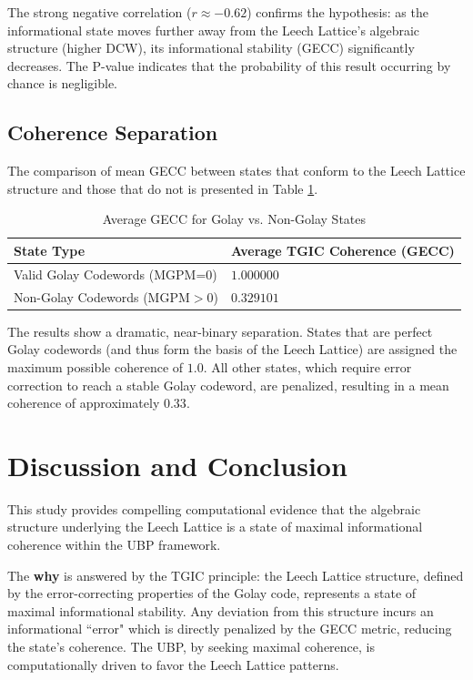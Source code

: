 \documentclass[10pt, a4paper]{article}
\begin{document}
The strong negative correlation ($r \approx -0.62$) confirms the hypothesis: as the informational state moves further away from the Leech Lattice's algebraic structure (higher DCW), its informational stability (GECC) significantly decreases. The P-value indicates that the probability of this result occurring by chance is negligible.

\subsection{Coherence Separation}

The comparison of mean GECC between states that conform to the Leech Lattice structure and those that do not is presented in Table \ref{tab:coherence_separation}.

\begin{table}[h]
    \centering
    \caption{Average GECC for Golay vs. Non-Golay States}
    \label{tab:coherence_separation}
    \begin{tabular}{ll}
        \toprule
        \textbf{State Type} & \textbf{Average TGIC Coherence (GECC)} \\
        \midrule
        Valid Golay Codewords (MGPM=0) & $1.000000$ \\
        Non-Golay Codewords (MGPM$>0$) & $0.329101$ \\
        \bottomrule
    \end{tabular}
\end{table}

The results show a dramatic, near-binary separation. States that are perfect Golay codewords (and thus form the basis of the Leech Lattice) are assigned the maximum possible coherence of $1.0$. All other states, which require error correction to reach a stable Golay codeword, are penalized, resulting in a mean coherence of approximately $0.33$.

\section{Discussion and Conclusion}

This study provides compelling computational evidence that the algebraic structure underlying the Leech Lattice is a state of maximal informational coherence within the UBP framework.

The \textbf{why} is answered by the TGIC principle: the Leech Lattice structure, defined by the error-correcting properties of the Golay code, represents a state of maximal informational stability. Any deviation from this structure incurs an informational ``error" which is directly penalized by the GECC metric, reducing the state's coherence. The UBP, by seeking maximal coherence, is computationally driven to favor the Leech Lattice patterns.
\end{document}
